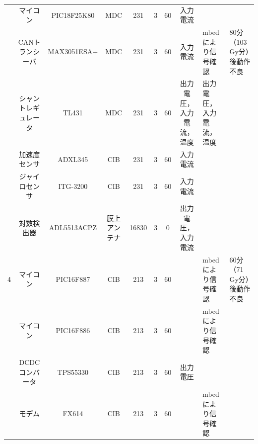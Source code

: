 \begin{landscape}
\begin{table}[htbp]
\begin{tabular}{c|c|c|c|c|c|c|c|l|l}
		& マイコン                 & PIC18F25K80          & MDC                  & 231                  & 3                    & 60                   & 入力電流                 &                      &                       \\
		& CANトランシーバ            & MAX3051ESA+          & MDC                  & 231                  & 3                    & 60                   & 入力電流                 & mbedにより信号確認          & 80分（103 Gy分）後動作不良 \\
		& シャントレギュレータ           & TL431                & MDC                  & 231                  & 3                    & 60                   & 出力電圧，入力電流，温度         & 出力電圧，入力電流，温度         &                       \\
		& 加速度センサ               & ADXL345              & CIB                  & 231                  & 3                    & 60                   & 入力電流                 &                      &                       \\
		& ジャイロセンサ              & ITG-3200             & CIB                  & 231                  & 3                    & 60                   & 入力電流                 &                      &                       \\
		& 対数検出器                & ADL5513ACPZ          & 膜上アンテナ               & 16830                & 3                    & 0                    & 出力電圧，入力電流            &                      &                       \\\hline
		4  & マイコン                 & PIC16F887            & CIB                  & 213                  & 3                    & 60                   &                      & mbedにより信号確認          & 60分（71 Gy分）後動作不良  \\
		& マイコン                 & PIC16F886            & CIB                  & 213                  & 3                    & 60                   &                      & mbedにより信号確認          &                       \\
		& DCDCコンバータ            & TPS55330             & CIB                  & 213                  & 3                    & 60                   & 出力電圧                 &                      &                       \\
		& モデム                  & FX614                & CIB                  & 213                  & 3                    & 60                   &                      & mbedにより信号確認          &                       \\

\end{tabular}
\end{table}
\end{landscape}
